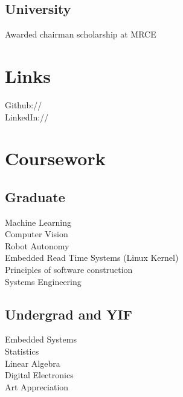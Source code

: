 \documentclass[]{resume-openfont}
\begin{document}
\begin{minipage}[t]{0.36\textwidth}
\subsection{University}
Awarded chairman scholarship at MRCE \\
\sectionsep


\section{Links} 
Github:// \href{https://github.com/tusharchugh}{} \\
LinkedIn://  \href{https://www.linkedin.com/in/tusharchugh}{} \\
\sectionsep


\section{Coursework}
\subsection{Graduate}
Machine Learning \\
Computer Vision \\
Robot Autonomy \\
Embedded Read Time Systems (Linux Kernel) \\
Principles of software construction \\
Systems Engineering \\
\sectionsep

\subsection{Undergrad and YIF}
Embedded Systems \\
Statistics \\
Linear Algebra \\
Digital Electronics \\
Art Appreciation \\


\end{minipage}
\end{document}

